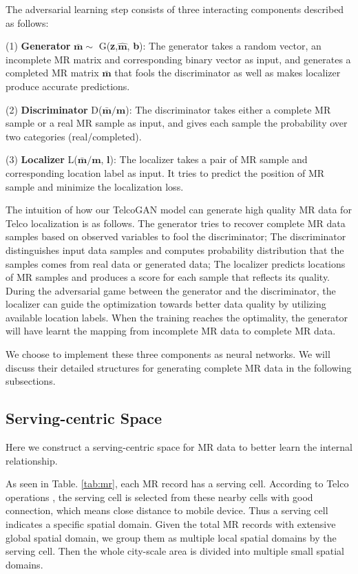 The adversarial learning step consists of three interacting components described as follows:

(1) \textbf{Generator} $\bar{\textbf{m}}\sim$ G(\textbf{z},$\hat{\textbf{m}}$, \textbf{b}): The generator takes a random vector, an incomplete MR matrix and corresponding binary vector as input, and generates a completed MR matrix $\bar{\textbf{m}}$ that fools the discriminator as well as makes localizer produce accurate predictions.

(2) \textbf{Discriminator} D($\bar{\textbf{m}}/\textbf{m}$): The discriminator takes either a complete MR sample or a real MR sample as input, and gives each sample the probability over two categories (real/completed).

(3) \textbf{Localizer} L($\bar{\textbf{m}}/\textbf{m}$, $\textbf{l}$): The localizer takes a pair of MR sample and corresponding location label as input. It tries to predict the position of MR sample and minimize the localization loss.

The intuition of how our TelcoGAN model can generate high quality MR data for Telco localization is as follows. The generator tries to recover complete MR data samples based on observed variables to fool the discriminator; The discriminator distinguishes input data samples and computes probability distribution that the samples comes from real data or generated data; The localizer predicts locations of MR samples and produces a score for each sample that reflects its quality. During the adversarial game between the generator and the discriminator, the localizer can guide the optimization towards better data quality by utilizing available location labels. When the training reaches the optimality, the generator will have learnt the mapping from incomplete MR data to complete MR data.

We choose to implement these three components as neural networks. We will discuss their detailed structures for generating complete MR data in the following subsections.

\subsection{Serving-centric Space}
Here we construct a serving-centric space for MR data to better learn the internal relationship.

As seen in Table. \ref{tab:mr}, each MR record has a serving cell. According to Telco operations \cite{DBLP:conf/infocom/RayDM16}, the serving cell is selected from these nearby cells with good connection, which means close distance to mobile device. Thus a serving cell indicates a specific spatial domain. Given the total MR records with extensive global spatial domain, we group them as multiple local spatial domains by the serving cell. Then the whole city-scale area is divided into multiple small spatial domains.

